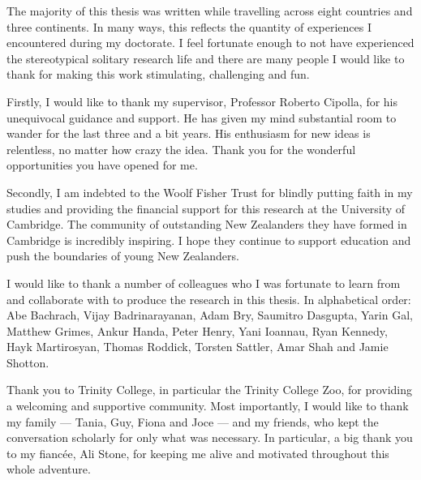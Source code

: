 
\begin{acknowledgements}     

The majority of this thesis was written while travelling across eight countries and three continents. In many ways, this reflects the quantity of experiences I encountered during my doctorate. I feel fortunate enough to not have experienced the stereotypical solitary research life and there are many people I would like to thank for making this work stimulating, challenging and fun.

Firstly, I would like to thank my supervisor, Professor Roberto Cipolla, for his unequivocal guidance and support. He has given my mind substantial room to wander for the last three and a bit years. His enthusiasm for new ideas is relentless, no matter how crazy the idea. Thank you for the wonderful opportunities you have opened for me.

Secondly, I am indebted to the Woolf Fisher Trust for blindly putting faith in my studies and providing the financial support for this research at the University of Cambridge. The community of outstanding New Zealanders they have formed in Cambridge is incredibly inspiring. I hope they continue to support education and push the boundaries of young New Zealanders.

I would like to thank a number of colleagues who I was fortunate to learn from and collaborate with to produce the research in this thesis. In alphabetical order: Abe Bachrach, Vijay Badrinarayanan, Adam Bry, Saumitro Dasgupta, Yarin Gal, Matthew Grimes, Ankur Handa, Peter Henry, Yani Ioannau, Ryan Kennedy, Hayk Martirosyan, Thomas Roddick, Torsten Sattler, Amar Shah and Jamie Shotton.

Thank you to Trinity College, in particular the Trinity College Zoo, for providing a welcoming and supportive community. Most importantly, I would like to thank my family --- Tania, Guy, Fiona and Joce --- and my friends, who kept the conversation scholarly for only what was necessary. In particular, a big thank you to my fianc\'{e}e, Ali Stone, for keeping me alive and motivated throughout this whole adventure.



\end{acknowledgements}
